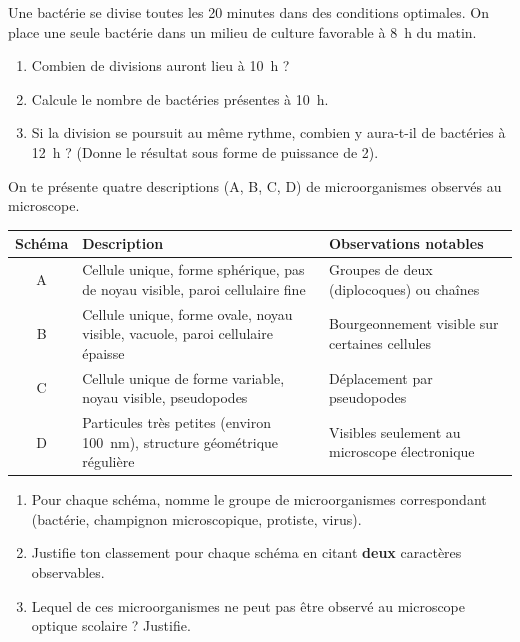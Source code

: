 \documentclass[11pt]{article}
\newcounter{popsec}
\newcounter{popsub}
\newcommand{\courssub}[1]{%
  \stepcounter{popsub}%
  \par\vspace{9pt}\noindent{\popxbold\fontsize{11.5}{13}\selectfont\color{popink}{\color{poporange}\thepopsec.\thepopsub}\hspace{6pt}#1}\par\nopagebreak\vspace{4pt}
}
\begin{document}
\begin{exercice}
Une bactérie se divise toutes les 20 minutes dans des conditions optimales. On place une seule bactérie dans un milieu de culture favorable à \SI{8}{h} du matin.
\begin{enumerate}
\item Combien de divisions auront lieu à \SI{10}{h} ?
\item Calcule le nombre de bactéries présentes à \SI{10}{h}.
\item Si la division se poursuit au même rythme, combien y aura-t-il de bactéries à \SI{12}{h} ? (Donne le résultat sous forme de puissance de 2).
\end{enumerate}
\end{exercice}

\courssub{Je m'entraîne}

\begin{exercice}
On te présente quatre descriptions (A, B, C, D) de microorganismes observés au microscope.
\begin{center}
\begin{tabularx}{\linewidth}{|c|X|X|}\hline
\textbf{Schéma} & \textbf{Description} & \textbf{Observations notables} \\ \hline
A & Cellule unique, forme sphérique, pas de noyau visible, paroi cellulaire fine & Groupes de deux (diplocoques) ou chaînes \\ \hline
B & Cellule unique, forme ovale, noyau visible, vacuole, paroi cellulaire épaisse & Bourgeonnement visible sur certaines cellules \\ \hline
C & Cellule unique de forme variable, noyau visible, pseudopodes & Déplacement par pseudopodes \\ \hline
D & Particules très petites (environ \SI{100}{nm}), structure géométrique régulière & Visibles seulement au microscope électronique \\ \hline
\end{tabularx}
\end{center}
\begin{enumerate}
\item Pour chaque schéma, nomme le groupe de microorganismes correspondant (bactérie, champignon microscopique, protiste, virus).
\item Justifie ton classement pour chaque schéma en citant \textbf{deux} caractères observables.
\item Lequel de ces microorganismes ne peut pas être observé au microscope optique scolaire ? Justifie.
\end{enumerate}
\end{exercice}
\end{document}
